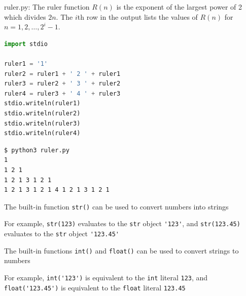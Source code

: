 \documentclass[8pt,a4paper,compress]{beamer}
\begin{document}
\begin{frame}[fragile]
\pause

\begin{framed}
\tiny ruler.py: The ruler function $R(n)$ is the exponent of the largest power of 2 which 
divides $2n$. The $i$th row in the output lists the values of $R(n)$ for $n=1,2,
\dots,2^i-1$.
\end{framed}

\begin{lstlisting}[language=Python,style=focusin]
import stdio

ruler1 = '1'
ruler2 = ruler1 + ' 2 ' + ruler1
ruler3 = ruler2 + ' 3 ' + ruler2
ruler4 = ruler3 + ' 4 ' + ruler3
stdio.writeln(ruler1)
stdio.writeln(ruler2)
stdio.writeln(ruler3)
stdio.writeln(ruler4)
\end{lstlisting}

\pause\bigskip

\begin{lstlisting}[language={},style=focusin]
$ python3 ruler.py 
1
1 2 1
1 2 1 3 1 2 1
1 2 1 3 1 2 1 4 1 2 1 3 1 2 1
\end{lstlisting}
\end{frame}

\begin{frame}[fragile]
\pause

The built-in function \lstinline{str()} can be used to convert numbers into strings

\pause\bigskip

For example, \lstinline{str(123)} evaluates to the \lstinline{str} object \lstinline{'123'}, and \lstinline{str(123.45)} evaluates to the \lstinline{str} object \lstinline{'123.45'}

\pause\bigskip

The built-in functions \lstinline{int()} and \lstinline{float()} can be used to convert strings to numbers

\pause\bigskip

For example, \lstinline{int('123')} is equivalent to the \lstinline{int} literal \lstinline{123}, and \lstinline{float('123.45')} is equivalent to the \lstinline{float} literal \lstinline{123.45}
\end{frame}
\end{document}
